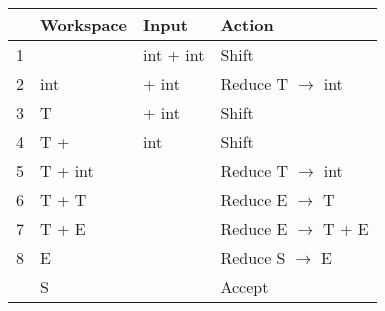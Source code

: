 \begin{center}
    \begin{tabular}{| l | l | l | l |}                              \hline
      & Workspace  & Input      & Action                         \\ \hline
    1 &            & int + int  & Shift                          \\ 
    2 & int        & + int      & Reduce T $\rightarrow$ int     \\ 
    3 & T          & + int      & Shift                          \\
    4 & T +        & int        & Shift                          \\ 
    5 & T + int    &            & Reduce T $\rightarrow$ int     \\ 
    6 & T + T      &            & Reduce E $\rightarrow$ T       \\ 
    7 & T + E      &            & Reduce E $\rightarrow$ T + E   \\
    8 & E          &            & Reduce S $\rightarrow$ E       \\ 
      & S          &            & Accept                         \\ \hline
    \end{tabular}
\end{center}



      

